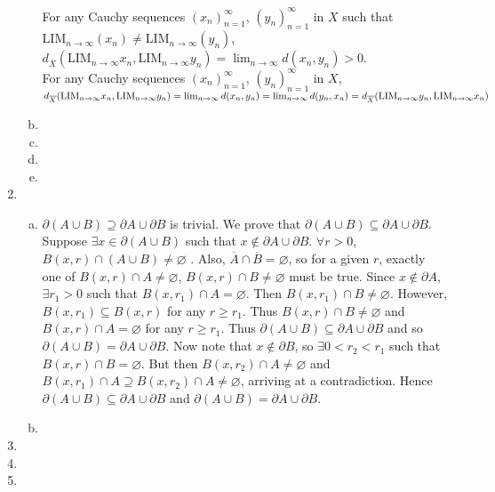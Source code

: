 \documentclass[A4paper,12pt]{article}
\theoremstyle{definition}
\numberwithin{equation}{section}
\begin{document}
\begin{enumerate}[(1)]
\begin{enumerate}[(a)]
                For any Cauchy sequences $(x_n)_{n = 1}^\infty$, $(y_n)_{n = 1}^\infty$ in $X$ such that $\mathrm{LIM}_{n \rightarrow \infty}(x_n) \neq \mathrm{LIM}_{n \rightarrow \infty}(y_n)$,
                $d_{\overline{X}}(\mathrm{LIM}_{n \rightarrow \infty}x_n,\mathrm{LIM}_{n \rightarrow \infty}y_n) = \lim_{n \rightarrow \infty} d(x_n, y_n) > 0$.
                \\
                For any Cauchy sequences $(x_n)_{n = 1}^\infty$, $(y_n)_{n = 1}^\infty$ in $X$, $d_{\overline{X}}(\mathrm{LIM}_{n \rightarrow \infty}x_n,\mathrm{LIM}_{n \rightarrow \infty}y_n ) = \lim_{n \rightarrow \infty} d(x_n, y_n)\\ = \lim_{n \rightarrow \infty} d(y_n, x_n) = d_{\overline{X}}(\mathrm{LIM}_{n \rightarrow \infty}y_n,\mathrm{LIM}_{n \rightarrow \infty}x_n )$
            \item
                
            \item

            \item

            \item
        \end{enumerate}
    \item
        \begin{enumerate}[(a)]
            \item
                $\partial(A \cup B) \supseteq \partial A \cup \partial B$ is trivial. 
                We prove that $\partial(A \cup B) \subseteq \partial A \cup \partial B$.
                Suppose $\exists x \in \partial(A\cup B)$ such that $x \not \in \partial A \cup \partial B$.
                $\forall r>0$, $B(x, r) \cap (A\cup B) \neq \varnothing$
                .
                Also, $\overline{A} \cap \overline{B} =  \varnothing$, so for a given $r$, exactly one of $B(x, r) \cap A \neq \varnothing$, $B(x, r) \cap B \neq \varnothing$ must be true.
                Since $x \not \in \partial A$, $\exists r_1 > 0$ such that $B(x, r_1)\cap A = \varnothing$. Then $B(x, r_1) \cap B \neq \varnothing$.
                However, $B(x, r_1) \subseteq B(x, r)$ for any $r \ge r_1$. 
                Thus $B(x, r) \cap B \neq \varnothing$ and $B(x, r) \cap A = \varnothing$ for any $r \ge r_1$.
                Thus $\partial(A  \cup B) \subseteq \partial A \cup \partial B$ and so $\partial(A  \cup B) = \partial A \cup \partial B$.
                Now note that $x \not \in \partial B$, so $\exists 0<r_2<r_1$ such that $B(x, r) \cap B = \varnothing$. But then $B(x, r_2) \cap A \neq \varnothing$ and $B(x, r_1)\cap A \supseteq B(x, r_2) \cap A \neq \varnothing$, arriving at a contradiction.
                Hence $\partial(A\cup B) \subseteq \partial A \cup \partial B$ and $\partial(A\cup B) = \partial A \cup \partial B$.
            \item

        \end{enumerate}
    \item
    \item
    \item


\end{enumerate}
\end{document}
